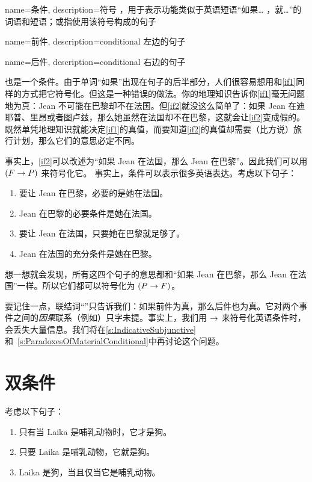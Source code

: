 {
name=条件,
description={符号 \eif，用于表示功能类似于英语短语“如果… ，就…”的词语和短语；或指使用该符号构成的句子}
}

{
name=前件,
description={\gls{conditional} 左边的句子}
}

{
name=后件,
description={\gls{conditional} 右边的句子}
}

也是一个条件。由于单词“如果”出现在句子的后半部分，人们很容易想用和\cref*{if1}同样的方式把它符号化。但这是一种错误的做法。你的地理知识告诉你\cref*{if1}毫无问题地为真：Jean 不可能在巴黎却不在法国。但\cref*{if2}就没这么简单了：如果 Jean 在迪耶普、里昂或者图卢兹，那么她虽然在法国却不在巴黎，这就会让\cref*{if2}变成假的。既然单凭地理知识就能决定\cref*{if1}的真值，而要知道\cref*{if2}的真值却需要（比方说）旅行计划，那么它们的意思必定不同。

事实上，\cref*{if2}可以改述为“如果 Jean 在法国，那么 Jean 在巴黎”。因此我们可以用 $(F \rightarrow P)$ 来符号化它。
\noindent 事实上，条件可以表示很多英语表达。考虑以下句子：

\begin{enumerate}
		\item\label{ifnec1} 要让 Jean 在巴黎，必要的是她在法国。
		\item\label{ifnec2} Jean 在巴黎的必要条件是她在法国。
		\item\label{ifsuf1} 要让 Jean 在法国，只要她在巴黎就足够了。
		\item\label{ifsuf2} Jean 在法国的充分条件是她在巴黎。
	\end{enumerate}

想一想就会发现，所有这四个句子的意思都和“如果 Jean 在巴黎，那么 Jean 在法国”一样。所以它们都可以符号化为 $(P \rightarrow F)$。

要记住一点，联结词“\eif”只告诉我们：如果前件为真，那么后件也为真。它对两个事件之间的\emph{因果}联系（例如）只字未提。事实上，我们用 $\rightarrow$ 来符号化英语条件时，会丢失大量信息。我们将在\cref{s:IndicativeSubjunctive}和~\cref{s:ParadoxesOfMaterialConditional}中再讨论这个问题。

\section{双条件}
考虑以下句子：

\begin{enumerate}
		\item\label{iff1} 只有当 Laika 是哺乳动物时，它才是狗。
		\item\label{iff2} 只要 Laika 是哺乳动物，它就是狗。
		\item\label{iff3} Laika 是狗，当且仅当它是哺乳动物。
	\end{enumerate}

